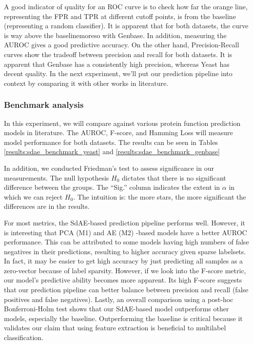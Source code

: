 \par A good indicator of quality for an ROC curve is to check how far the
orange line, representing the FPR and TPR at different cutoff points, is from
the baseline (representing a random classifier). It is apparent that for both
datasets, the curve is way above the baseline\textemdash moreso with
Genbase. In addition, measuring the AUROC gives a good predictive accuracy.
On the other hand, Precision-Recall curves show the tradeoff between
precision and recall for both datasets. It is apparent that Genbase has a
consistently high precision, whereas Yeast has decent quality. In the next
experiment, we'll put our prediction pipeline into context by comparing it
with other works in literature.


\subsubsection{Benchmark analysis}

\par In this experiment, we will compare against various protein function
prediction models in literature. The AUROC, F-score, and Hamming Loss will
measure model performance for both datasets. The results can be seen in
Tables \ref{results:sdae_benchmark_yeast} and
\ref{results:sdae_benchmark_genbase}

\par In addition, we conducted Friedman's test to assess significance in our
measurements. The null hypothesis $H_{0}$ dictates that there is no
significant difference between the groups. The ``Sig.'' column indicates the
extent in $\alpha$ in which we can reject $H_{0}$. The intuition is: the more
stars, the more significant the differences are in the results.

\par For most metrics, the SdAE-based prediction pipeline performs well.
However, it is interesting that PCA (M1) and AE (M2) -based models have a
better AUROC performance. This can be attributed to some models having high
numbers of false negatives in their predictions, resulting to higher
accuracy given sparse labelsets. In fact, it may be easier to get high accuracy
by just predicting all samples as a zero-vector because of label sparsity.
However, if we look into the F-score metric, our model's predictive ability
becomes more apparent. Its high F-score suggests that our prediction pipeline
can better balance between precision and recall (false positives and false
negatives). Lastly, an overall comparison using a post-hoc Bonferroni-Holm test
shows that our SdAE-based model outperforms other models, especially the
baseline. Outperforming the baseline is critical because it validates our claim
that using feature extraction is beneficial to multilabel classification.

